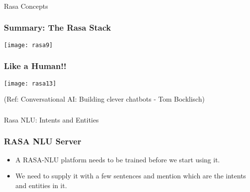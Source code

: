 \begin{frame}[fragile]\frametitle{}
\begin{center}
{\Large Rasa Concepts}

\end{center}
\end{frame}

 \begin{frame}[fragile]\frametitle{Summary: The Rasa Stack}

\begin{center}
\texttt{[image: rasa9]}
\end{center}



\end{frame}


\begin{frame}[fragile]\frametitle{Like a Human!!}


\begin{center}
\texttt{[image: rasa13]}
\end{center}


{\tiny (Ref: Conversational AI: Building clever chatbots - Tom Bocklisch)}

\end{frame}

\begin{frame}[fragile]\frametitle{}
\begin{center}

{\Large Rasa NLU: Intents and Entities}

\end{center}
\end{frame}

 \begin{frame}[fragile]\frametitle{RASA NLU Server}
\begin{itemize}
\item A RASA-NLU platform needs to be trained before we start using it. 
\item We need to supply it with a few sentences and mention which are the intents and entities in it.
\end{itemize}
\end{frame}

